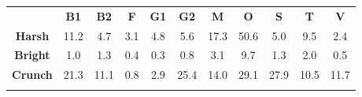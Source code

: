 \begin{tabular}{|c||c|c|c|c|c|c|c|c|c|c|}
	\cline{2-11}
	\multicolumn{1}{c|}{} & \bf{B1} & \bf{B2} & \bf{F} & \bf{G1} & \bf{G2} & \bf{M} & \bf{O} & \bf{S} & \bf{T} & \bf{V} \tabularnewline
	\hhline{-::=:=:=:=:=:=:=:=:=:=:}
	\bf{Harsh} & 11.2 &  4.7 &  3.1 &  4.8 &  5.6 & 17.3 & 50.6 &  5.0 &  9.5 &  2.4 \tabularnewline
	\hhline{-||-|-|-|-|-|-|-|-|-|-|}
	\bf{Bright} & 1.0 & 1.3 & 0.4 & 0.3 & 0.8 & 3.1 & 9.7 & 1.3 & 2.0 & 0.5 \tabularnewline
	\hhline{-||-|-|-|-|-|-|-|-|-|-|}
	\bf{Crunch} & 21.3 & 11.1 &  0.8 &  2.9 & 25.4 & 14.0 & 29.1 & 27.9 & 10.5 & 11.7 \tabularnewline
	\hhline{-||-|-|-|-|-|-|-|-|-|-|}
\end{tabular}

